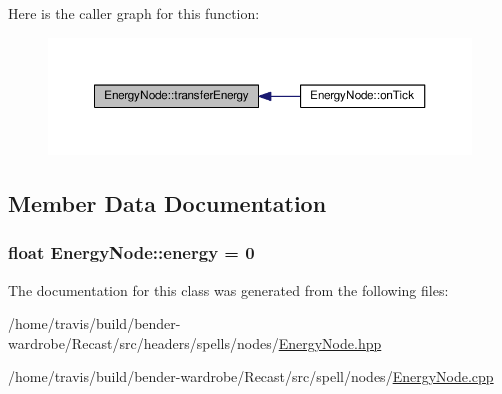 Here is the caller graph for this function\-:
\nopagebreak
\begin{figure}[H]
\begin{center}
\leavevmode
\includegraphics[width=350pt]{class_energy_node_a04b3fe7a8aa49157a5c66ee8e25cfb3b_icgraph}
\end{center}
\end{figure}




\subsection{Member Data Documentation}
\hypertarget{class_energy_node_ac2cd46828178316e24f339489f553852}{
\subsubsection[{energy}]{\setlength{\rightskip}{0pt plus 5cm}float Energy\-Node\-::energy = 0\hspace{0.3cm}{\ttfamily [protected]}}}\label{class_energy_node_ac2cd46828178316e24f339489f553852}


The documentation for this class was generated from the following files\-:\begin{DoxyCompactItemize}
\item 
/home/travis/build/bender-\/wardrobe/\-Recast/src/headers/spells/nodes/\hyperlink{_energy_node_8hpp}{Energy\-Node.\-hpp}\item 
/home/travis/build/bender-\/wardrobe/\-Recast/src/spell/nodes/\hyperlink{_energy_node_8cpp}{Energy\-Node.\-cpp}\end{DoxyCompactItemize}
